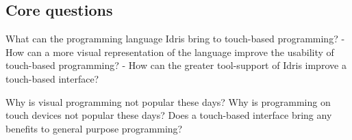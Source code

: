 \subsection{Core questions}
\label{subsec:CoreQuestions}

What can the programming language Idris bring to touch-based programming?
  - How can a more visual representation of the language improve the usability of touch-based programming?
  - How can the greater tool-support of Idris improve a touch-based interface?

Why is visual programming not popular these days?
Why is programming on touch devices not popular these days?
Does a touch-based interface bring any benefits to general purpose programming?

